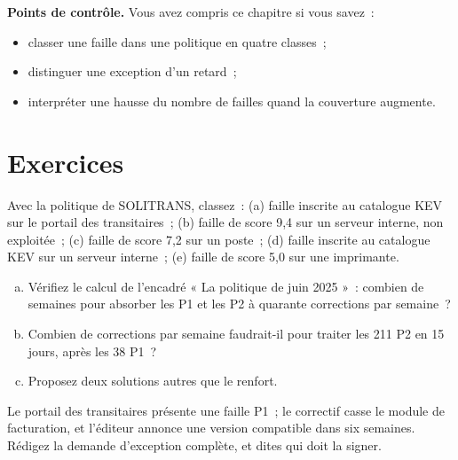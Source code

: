 \begin{boxinfo}
\textbf{Points de contrôle.} Vous avez compris ce chapitre si vous savez~:
\begin{itemize}
    \item classer une faille dans une politique en quatre classes~;
    \item distinguer une exception d'un retard~;
    \item interpréter une hausse du nombre de failles quand la couverture
          augmente.
\end{itemize}
\end{boxinfo}

\section*{Exercices}

\begin{boxexo}[title={\ding{45}\quad Exercice~11.1. Classer \niveaubase}]
Avec la politique de SOLITRANS, classez~: (a) faille inscrite au catalogue
KEV sur le portail des transitaires~; (b) faille de score 9,4 sur un serveur
interne, non exploitée~; (c) faille de score 7,2 sur un poste~; (d) faille
inscrite au catalogue KEV sur un serveur interne~; (e) faille de score 5,0
sur une imprimante.
\end{boxexo}

\begin{boxexo}[title={\ding{45}\quad Exercice~11.2. Le stock de P2 \niveaumoyen}]
\begin{enumerate}[(a)]
    \item Vérifiez le calcul de l'encadré « La politique de juin 2025 »~:
          combien de semaines pour absorber les P1 et les P2 à quarante
          corrections par semaine~?
    \item Combien de corrections par semaine faudrait-il pour traiter les
          211 P2 en 15 jours, après les 38 P1~?
    \item Proposez deux solutions autres que le renfort.
\end{enumerate}
\end{boxexo}

\begin{boxexo}[title={\ding{45}\quad Exercice~11.3. Instruire une exception \niveaumoyen}]
Le portail des transitaires présente une faille P1~; le correctif casse le
module de facturation, et l'éditeur annonce une version compatible dans six
semaines. Rédigez la demande d'exception complète, et dites qui doit la
signer.
\end{boxexo}

